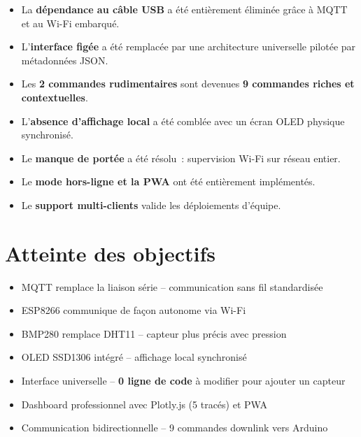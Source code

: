 \documentclass[12pt, a4paper]{report}
\begin{document}
\begin{itemize}[leftmargin=1.5cm, itemsep=5pt]
  \item La \textbf{d\'ependance au c\^able USB} a \'et\'e enti\`erement
        \'elimin\'ee gr\^ace \`a MQTT et au Wi-Fi embarqu\'e.
  \item L'\textbf{interface fig\'ee} a \'et\'e remplac\'ee par une
        architecture universelle pilot\'ee par m\'etadonn\'ees JSON.
  \item Les \textbf{2 commandes rudimentaires} sont devenues
        \textbf{9 commandes riches et contextuelles}.
  \item L'\textbf{absence d'affichage local} a \'et\'e combl\'ee avec
        un \'ecran OLED physique synchronis\'e.
  \item Le \textbf{manque de port\'ee} a \'et\'e r\'esolu~:
        supervision Wi-Fi sur r\'eseau entier.
  \item Le \textbf{mode hors-ligne et la PWA} ont \'et\'e enti\`erement
        impl\'ement\'es.
  \item Le \textbf{support multi-clients} valide les d\'eploiements
        d'\'equipe.
\end{itemize}

\section{Atteinte des objectifs}

\begin{successbox}
\begin{itemize}[leftmargin=1cm, itemsep=4pt]
  \item[\ding{51}] MQTT remplace la liaison s\'erie --
        communication sans fil standardis\'ee
  \item[\ding{51}] ESP8266 communique de fa\c{c}on autonome via Wi-Fi
  \item[\ding{51}] BMP280 remplace DHT11 --
        capteur plus pr\'ecis avec pression
  \item[\ding{51}] OLED SSD1306 int\'egr\'e --
        affichage local synchronis\'e
  \item[\ding{51}] Interface universelle --
        \textbf{0 ligne de code} \`a modifier pour ajouter un capteur
  \item[\ding{51}] Dashboard professionnel avec Plotly.js (5 trac\'es)
        et PWA
  \item[\ding{51}] Communication bidirectionnelle --
        9 commandes downlink vers Arduino
\end{itemize}
\end{successbox}
\end{document}
